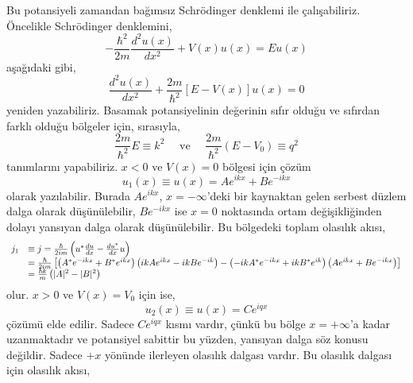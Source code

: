 \documentclass[00_kitap.tex]{subfiles}
\begin{document}
Bu potansiyeli zamandan bağımsız Schrödinger denklemi ile çalışabiliriz. Öncelikle Schrödinger denklemini,
\begin{equation}
- \frac { \hbar ^ { 2 } } { 2 m } \frac { d ^ { 2 } u ( x ) } { d x ^ { 2 } } + V ( x ) u ( x ) = E u ( x )
\end{equation}
aşağıdaki gibi,
\begin{equation}
\frac { d ^ { 2 } u ( x ) } { d x ^ { 2 } } + \frac { 2 m } { \hbar ^ { 2 } } [ E - V ( x ) ] u ( x ) = 0
\end{equation}
yeniden yazabiliriz. Basamak potansiyelinin değerinin sıfır olduğu ve sıfırdan farklı olduğu bölgeler için, sırasıyla,
\begin{equation}
\frac { 2 m} { \hbar ^ { 2 } } E \equiv k ^ { 2 } \quad \text{ ve } \quad \frac { 2 m} { \hbar ^ { 2 } }  \left( E - V _ { 0 } \right)  \equiv q ^ { 2 }
\end{equation}
tanımlarını yapabiliriz. $x<0$ ve $V(x)=0$ bölgesi için çözüm
\begin{equation}
u_1 ( x ) \equiv u ( x ) = A e ^ { i k x } + B e ^ { - i k x }
\end{equation}
olarak yazılabilir. Burada $A e ^ { i k x }$, $x=-\infty$'deki bir kaynaktan gelen serbest düzlem dalga olarak düşünülebilir, $B e ^ { -i k x }$ ise $x=0$ noktasında ortam değişikliğinden dolayı yansıyan dalga olarak düşünülebilir. Bu bölgedeki toplam olasılık akısı,
\begin{equation}
\begin{array} { r l } 
{ j_1 } &\equiv  j  = \frac { \hbar } { 2 i m } \left( u ^ { * } \frac { d u } { d x } - \frac { d u ^ { * } } { d x } u \right) \\
& = \frac { \hbar } { 2 i m } \left[ \left(A^{*} e ^ { - i k x } + B ^ { * } e ^ { i k x } \right) \left(i k A e ^ { i k x } - i k B e ^ { - i k } \right) - \left( -i k A^{*} e ^ { -i k x } + i k B^* e ^ {  i k } \right) \left( A e ^ { i k x } + B  e ^ { -i k x } \right)  \right]  \\ 
{ } & { = \frac { \hbar k } { m } \left( | A | ^ { 2 }  - | B | ^ { 2 } \right) } \end{array}
\end{equation}
olur. $x>0$ ve $V(x)=V_0$ için ise,
\begin{equation}
u_2 ( x ) \equiv u ( x ) =  C e ^ { i q x }
\end{equation}
çözümü elde edilir. Sadece $C e ^ { i q x }$ kısmı vardır, çünkü bu bölge $x=+\infty$'a kadar uzanmaktadır ve potansiyel sabittir bu yüzden, yansıyan dalga söz konusu değildir. Sadece $+x$ yönünde ilerleyen olasılık dalgası vardır. Bu olasılık dalgası için olasılık akısı,
\end{document}
